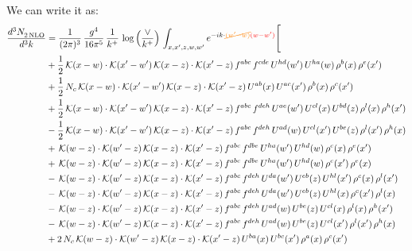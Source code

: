 \documentclass[9pt]{article}
\numberwithin{equation}{section}
\begin{document}
We can write it as:
\begin{align}
    \frac{d^{3}N_{2\,\rm NLO}^{\rm}}{d^{3}k}  & = \frac{1}{(2\pi)^{3}}\,\frac{g^{4}}{16\pi^{5}}\,\frac{1}{k^{+}}\,\log{\left(\frac{\vee}{k^{+}}\right)}\, \int_{x,x',z,w,w'}e^{-ik\cdot{\color{orange}\cancel{(w'-w)}}{\color{red}(w-w')}}\Bigg[\notag\\ & +\frac{1}{2}\,\mathcal{K}(x-w)\cdot\mathcal{K}(x'-w')\,\mathcal{K}(x-z)\cdot\mathcal{K}(x'-z)\,f^{abc}\,f^{cde}\,U^{hd}(w')\,U^{ha}(w)\,\rho^{b}(x)\,\rho^{e}(x')\notag \\ 
&+\frac{1}{2}\,N_{c}\,\mathcal{K}(x-w)\cdot\mathcal{K}(x'-w')\,\mathcal{K}(x-z)\cdot\mathcal{K}(x'-z)\,U^{ab}(x)\,U^{ac}(x')\,\rho^{b}(x)\,\rho^{c}(x')\notag \\ 
&+\frac{1}{2}\,\mathcal{K}(x-w)\cdot\mathcal{K}(x'-w')\,\mathcal{K}(x-z)\cdot\mathcal{K}(x'-z)\,f^{abc}\,f^{deh}\,U^{ae}(w')\,U^{cl}(x)\,U^{bd}(z)\,\rho^{l}(x)\,\rho^{h}(x')\notag \\ 
&-\frac{1}{2}\,\mathcal{K}(x-w)\cdot\mathcal{K}(x'-w')\,\mathcal{K}(x-z)\cdot\mathcal{K}(x'-z)\,f^{abc}\,f^{deh}\,U^{ad}(w)\,U^{cl}(x')\,U^{be}(z)\,\rho^{l}(x')\,\rho^{h}(x)\notag \\ 
&+\,\mathcal{K}(w-z)\cdot\mathcal{K}(w'-z)\,\mathcal{K}(x-z)\cdot\mathcal{K}(x'-z)\,f^{abc}\,f^{dbe}\,U^{ha}(w')\,U^{hd}(w)\,\rho^{c}(x)\,\rho^{e}(x')\notag \\ 
&+\,\mathcal{K}(w-z)\cdot\mathcal{K}(w'-z)\,\mathcal{K}(x-z)\cdot\mathcal{K}(x'-z)\,f^{abc}\,f^{dbe}\,U^{ha}(w')\,U^{hd}(w)\,\rho^{c}(x')\,\rho^{e}(x)\notag \\ 
&-\,\mathcal{K}(w-z)\cdot\mathcal{K}(w'-z)\,\mathcal{K}(x-z)\cdot\mathcal{K}(x'-z)\,f^{abc}\,f^{deh}\,U^{da}(w')\,U^{eb}(z)\,U^{hl}(x')\,\rho^{c}(x)\,\rho^{l}(x')\notag \\ 
&-\,\mathcal{K}(w-z)\cdot\mathcal{K}(w'-z)\,\mathcal{K}(x-z)\cdot\mathcal{K}(x'-z)\,f^{abc}\,f^{deh}\,U^{da}(w')\,U^{eb}(z)\,U^{hl}(x)\,\rho^{c}(x')\,\rho^{l}(x)\notag \\ 
&-\,\mathcal{K}(w-z)\cdot\mathcal{K}(w'-z)\,\mathcal{K}(x-z)\cdot\mathcal{K}(x'-z)\,f^{abc}\,f^{deh}\,U^{ad}(w)\,U^{be}(z)\,U^{cl}(x)\,\rho^{l}(x)\,\rho^{h}(x')\notag \\ 
&-\,\mathcal{K}(w-z)\cdot\mathcal{K}(w'-z)\,\mathcal{K}(x-z)\cdot\mathcal{K}(x'-z)\,f^{abc}\,f^{deh}\,U^{ad}(w)\,U^{be}(z)\,U^{cl}(x')\,\rho^{l}(x')\,\rho^{h}(x)\notag \\ 
&+2\,N_{c}\,\mathcal{K}(w-z)\cdot\mathcal{K}(w'-z)\,\mathcal{K}(x-z)\cdot\mathcal{K}(x'-z)\,U^{ba}(x)\,U^{bc}(x')\,\rho^{a}(x)\,\rho^{c}(x')\notag \\ 

\end{align}
\end{document}
